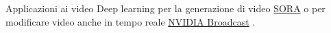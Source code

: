 \documentclass[aspectratio=169]{beamer}
\begin{document}
\begin{frame}{Applicazioni ai video}
    Deep learning per la generazione di video \href{https://openai.com/index/sora/}{SORA}  o per modificare video anche in tempo reale \href{https://www.nvidia.com/it-it/geforce/broadcasting/broadcast-app/}{NVIDIA Broadcast} .
    \vspace{-0.6cm}
    \begin{columns}[T] %
        \begin{column}{.33\textwidth}
            \begin{center}
            \end{center}
        \end{column}%
        \begin{column}{.33\textwidth}
            \begin{center}

\end{center}
\end{column}
\end{columns}
\end{frame}
\end{document}
